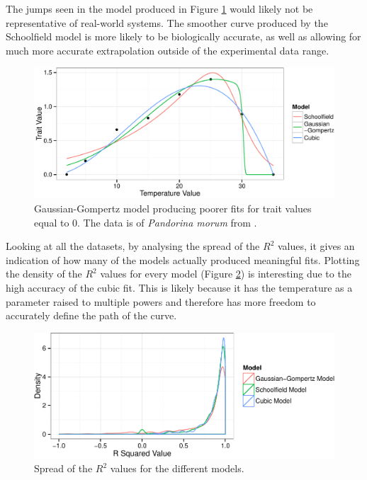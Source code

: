 \documentclass[11pt]{article}
\begin{document}
\FloatBarrier

The jumps seen in the model produced in Figure \ref{fig:jumps} would likely not be representative of real-world systems. The smoother curve produced by the Schoolfield model is more likely to be biologically accurate, as well as allowing for much more accurate extrapolation outside of the experimental data range.

\begin{figure}[h]
\begin{center}
\includegraphics[scale = 1]{jumps.pdf}
\caption{Gaussian-Gompertz model producing poorer fits for trait values equal to 0. The data is of \textit{Pandorina morum} from \cite{Moss1973}.}
\label{fig:jumps}
\end{center}
\end{figure}

Looking at all the datasets, by analysing the spread of the \(R^2\) values, it gives an indication of how many of the models actually produced meaningful fits. Plotting the density of the \(R^2\) values for every model (Figure \ref{fig:r_distr}) is interesting due to the high accuracy of the cubic fit. This is likely because it has the temperature as a parameter raised to multiple powers and therefore has more freedom to accurately define the path of the curve.

\begin{figure}[h]
\begin{center}
\includegraphics[scale = 1]{r_distr.pdf}
\caption{Spread of the \(R^2\) values for the different models.}
\label{fig:r_distr}
\end{center}
\end{figure}
\end{document}
